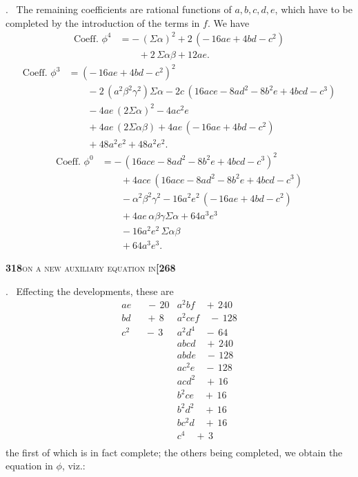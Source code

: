 \documentclass[11pt]{article}
\begin{document}
\medskip

. \ The remaining coefficients are rational functions of $a, b, c, d, e$, which have to be completed by the introduction of the terms in $f$. We have
\[
\begin{aligned}
   \text{Coeff.\ }\phi^4 &= -\,(\Sigma\alpha)^2 + 2\,(-\,16 a e + 4 b d - c^2)\\
   &\qquad{} + 2\,\Sigma\alpha\beta + 12 a e.
\end{aligned}
\]
\[
\begin{aligned}
   \text{Coeff.\ }\phi^3 &= (-\,16 a e + 4 b d - c^2)^2\\
   &\qquad{} - 2\,(a^2\beta^2\gamma^2)\Sigma\alpha - 2 c\,(16 a c e - 8 a d^2 - 8 b^2 e + 4 b c d - c^3)\\
   &\qquad{} - 4 a e\,(2\Sigma\alpha)^2 - 4 a c^2 e\\
   &\qquad{} + 4 a e\,(2\Sigma\alpha\beta) + 4 a e\,(-\,16 a e + 4 b d - c^2)\\
   &\qquad{} + 48 a^2 e^2 + 48 a^2 e^2.
\end{aligned}
\]
\[
\begin{aligned}
   \text{Coeff.\ }\phi^0 &= -\,(16 a c e - 8 a d^2 - 8 b^2 e + 4 b c d - c^3)^2\\
   &\qquad{} + 4 a c e\,(16 a c e - 8 a d^2 - 8 b^2 e + 4 b c d - c^3)\\
   &\qquad{} - \alpha^2\beta^2\gamma^2 - 16 a^2 e^2\,(-\,16 a e + 4 b d - c^2)\\
   &\qquad{} + 4 a e\,\alpha\beta\gamma\Sigma\alpha + 64 a^3 e^3\\
   &\qquad{} - 16 a^2 e^2\,\Sigma\alpha\beta\\
   &\qquad{} + 64 a^3 e^3.
\end{aligned}
\]

\newpage
\setcounter{page}{318}

\noindent\textbf{318}\hfill\textsc{on a new auxiliary equation in}\hfill\textbf{[268}

\medskip

. \ Effecting the developments, these are
\[
\begin{array}{rr}
a e\;\;\quad -\,20 & a^2 b f\quad +\,240\\
b d\;\;\quad +\,8 & a^2 c e f\quad -\,128\\
c^2\;\;\quad -\,3 & a^2 d^4\quad -\,64 \\
& a b c d\quad +\,240\\
& a b d e\quad -\,128\\
& a c^2 e\quad -\,128\\
& a c d^2\quad +\,16\\
& b^2 c e\quad +\,16\\
& b^2 d^2\quad +\,16\\
& b c^2 d\quad +\,16\\
& c^4\quad +\,3\\
\end{array}
\]
the first of which is in fact complete; the others being completed, we obtain the equation in $\phi$, viz.:
\end{document}
